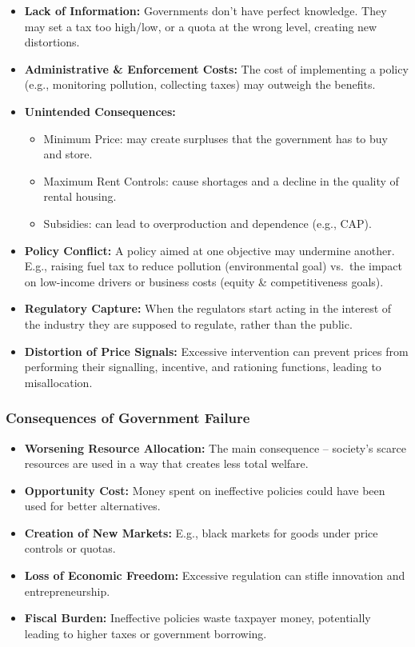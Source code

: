 \documentclass[11pt, a4paper, twoside]{book}
\begin{document}
\begin{itemize}
  \item \textbf{Lack of Information:} Governments don't have perfect knowledge. They may set a tax too high/low, or a quota at the wrong level, creating new distortions.
  \item \textbf{Administrative \& Enforcement Costs:} The cost of implementing a policy (e.g., monitoring pollution, collecting taxes) may outweigh the benefits.
  \item \textbf{Unintended Consequences:}
  \begin{itemize}
    \item Minimum Price: may create surpluses that the government has to buy and store.
    \item Maximum Rent Controls: cause shortages and a decline in the quality of rental housing.
    \item Subsidies: can lead to overproduction and dependence (e.g., CAP).
  \end{itemize}
  \item \textbf{Policy Conflict:} A policy aimed at one objective may undermine another. E.g., raising fuel tax to reduce pollution (environmental goal) vs.\ the impact on low-income drivers or business costs (equity \& competitiveness goals).
  \item \textbf{Regulatory Capture:} When the regulators start acting in the interest of the industry they are supposed to regulate, rather than the public.
  \item \textbf{Distortion of Price Signals:} Excessive intervention can prevent prices from performing their signalling, incentive, and rationing functions, leading to misallocation.
\end{itemize}

\subsubsection{Consequences of Government Failure}

\begin{itemize}
  \item \textbf{Worsening Resource Allocation:} The main consequence -- society's scarce resources are used in a way that creates less total welfare.
  \item \textbf{Opportunity Cost:} Money spent on ineffective policies could have been used for better alternatives.
  \item \textbf{Creation of New Markets:} E.g., black markets for goods under price controls or quotas.
  \item \textbf{Loss of Economic Freedom:} Excessive regulation can stifle innovation and entrepreneurship.
  \item \textbf{Fiscal Burden:} Ineffective policies waste taxpayer money, potentially leading to higher taxes or government borrowing.
\end{itemize}
\end{document}
